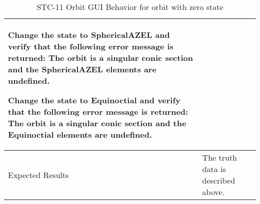 \begin{table}[htbp!]
\begin{tabular}{|p{1.05 in} |p{4.75 in} |}
\begin{compactenum}
             \item Change the state to SphericalAZEL and verify that the following error message is returned: The orbit is a singular conic section and the SphericalAZEL elements are undefined.
             \item Change the state to Equinoctial and verify that the following error message is returned:
                   The orbit is a singular conic section and the Equinoctial elements are undefined.
         \end{compactenum}
         \\ \hline
         Expected Results & The truth data is described above.\\
      \hline
      \end{tabular}
      \label{Table:STC-11}
      \caption{STC-11 Orbit GUI Behavior for orbit with zero state}
\end{table} 